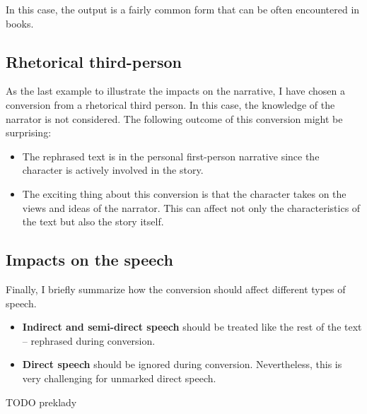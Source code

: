 In this case, the output is a fairly common form that can be often encountered in books.

\subsection*{Rhetorical third-person}

As the last example to illustrate the impacts on the narrative, I have chosen a conversion from a rhetorical third person. In this case, the knowledge of the narrator is not considered. The following outcome of this conversion might be surprising:

\begin{itemize}
	\item The rephrased text is in the personal first-person narrative since the character is actively involved in the story.
	\item The exciting thing about this conversion is that the character takes on the views and ideas of the narrator. This can affect not only the characteristics of the text but also the story itself.
\end{itemize}


\subsection*{Impacts on the speech}

Finally, I briefly summarize how the conversion should affect different types of speech.

\begin{itemize}
	\item \textbf{Indirect and semi-direct speech} should be treated like the rest of the text -- rephrased during conversion.
	\item \textbf{Direct speech} should be ignored during conversion. Nevertheless, this is very challenging for unmarked direct speech.
\end{itemize}


TODO preklady
